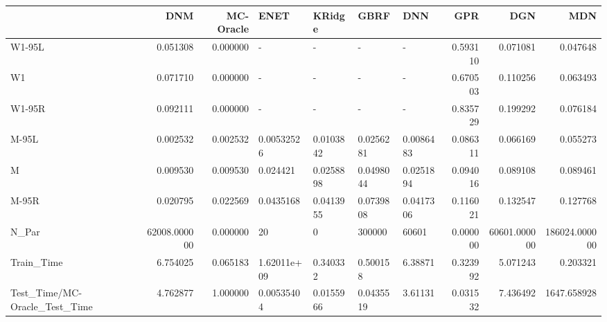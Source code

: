 \begin{tabular}{lrrllllrrr}
\toprule
{} &           DNM &  MC-Oracle &         ENET &     KRidge &       GBRF &        DNN &       GPR &           DGN &            MDN \\
\midrule
W1-95L                        &      0.051308 &   0.000000 &            - &          - &          - &          - &  0.593110 &      0.071081 &       0.047648 \\
W1                            &      0.071710 &   0.000000 &            - &          - &          - &          - &  0.670503 &      0.110256 &       0.063493 \\
W1-95R                        &      0.092111 &   0.000000 &            - &          - &          - &          - &  0.835729 &      0.199292 &       0.076184 \\
M-95L                         &      0.002532 &   0.002532 &   0.00532526 &  0.0103842 &  0.0256281 &  0.0086483 &  0.086311 &      0.066169 &       0.055273 \\
M                             &      0.009530 &   0.009530 &     0.024421 &  0.0258898 &  0.0498044 &  0.0251894 &  0.094016 &      0.089108 &       0.089461 \\
M-95R                         &      0.020795 &   0.022569 &    0.0435168 &  0.0413955 &  0.0739808 &  0.0417306 &  0.116021 &      0.132547 &       0.127768 \\
N\_Par                         &  62008.000000 &   0.000000 &           20 &          0 &     300000 &      60601 &  0.000000 &  60601.000000 &  186024.000000 \\
Train\_Time                    &      6.754025 &   0.065183 &  1.62011e+09 &   0.340332 &   0.500158 &    6.38871 &  0.323992 &      5.071243 &       0.203321 \\
Test\_Time/MC-Oracle\_Test\_Time &      4.762877 &   1.000000 &   0.00535404 &  0.0155966 &  0.0435519 &    3.61131 &  0.031532 &      7.436492 &    1647.658928 \\
\bottomrule
\end{tabular}
